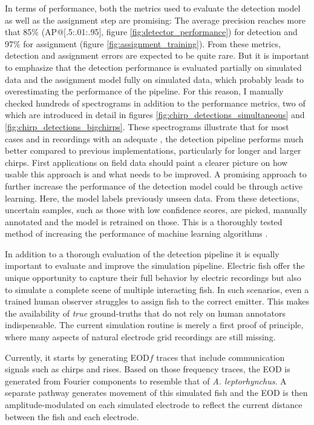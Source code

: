 In terms of performance, both the metrics used to evaluate the detection model
as well as the assignment step are promising: The average precision reaches
more that 85\% (AP@[.5:.01:.95], figure \ref{fig:detector_performance}) for
detection and 97\% for assignment (figure \ref{fig:assignment_training}). From
these metrics, detection and assignment errors are expected to be quite rare.
But it is important to emphasize that the detection performance is evaluated
partially on simulated data and the assignment model fully on simulated data,
which probably leads to overestimating the performance of the pipeline. For
this reason, I manually checked hundreds of spectrograms in addition to the
performance metrics, two of which are introduced in detail in figures
\ref{fig:chirp_detections_simultaneous} and
\ref{fig:chirp_detections_bigchirps}. These spectrograms illustrate that for
most cases and in recordings with an adequate , the detection
pipeline performs much better compared to previous implementations,
particularly for longer and larger chirps. First applications on field data
should paint a clearer picture on how usable this approach is and what needs to
be improved. A promising approach to further increase the performance of the
detection model could be through active learning. Here, the model labels
previously unseen data. From these detections, uncertain samples, such as those
with low confidence scores, are picked, manually annotated and the model is
retrained on those. This is a thoroughly tested method of increasing the
performance of machine learning algorithms
\parencite{zhanComparativeSurveyDeep2022}.

In addition to a thorough evaluation of the detection pipeline it is equally
important to evaluate and improve the simulation pipeline. Electric fish offer
the unique opportunity to capture their full behavior by electric recordings
but also to simulate a complete scene of multiple interacting fish. In such
scenarios, even a trained human observer struggles to assign fish to the
correct emitter. This makes the availability of \emph{true} ground-truths that
do not rely on human annotators indispensable. The current simulation routine
is merely a first proof of principle, where many aspects of natural electrode
grid recordings are still missing.

Currently, it starts by generating EOD$f$ traces that include communication
signals such as chirps and rises. Based on those frequency traces, the EOD is
generated from Fourier components to resemble that of \textit{A.
leptorhynchus}. A separate pathway generates movement of this simulated fish
and the EOD is then amplitude-modulated on each simulated electrode to reflect
the current distance between the fish and each electrode.

